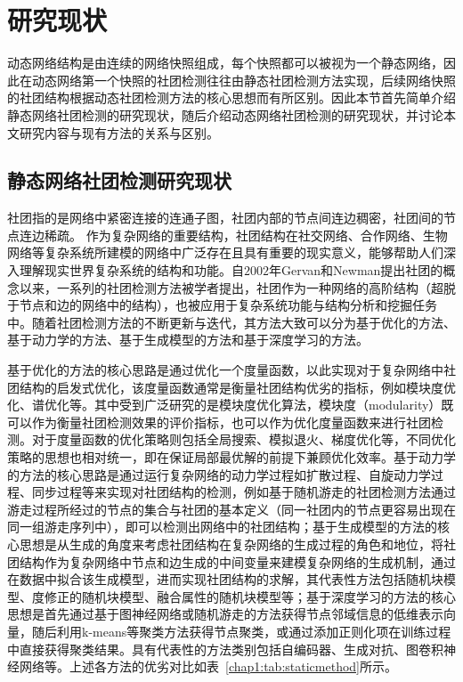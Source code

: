 \section{研究现状}


动态网络结构是由连续的网络快照组成，每个快照都可以被视为一个静态网络，因此在动态网络第一个快照的社团检测往往由静态社团检测方法实现，后续网络快照的社团结构根据动态社团检测方法的核心思想而有所区别。因此本节首先简单介绍静态网络社团检测的研究现状，随后介绍动态网络社团检测的研究现状，并讨论本文研究内容与现有方法的关系与区别。
\subsection{静态网络社团检测研究现状}

社团指的是网络中紧密连接的连通子图，社团内部的节点间连边稠密，社团间的节点连边稀疏。
作为复杂网络的重要结构，社团结构在社交网络、合作网络、生物网络等复杂系统所建模的网络中广泛存在且具有重要的现实意义，能够帮助人们深入理解现实世界复杂系统的结构和功能\cite{peng2024unsupervised}。自$2002$年Gervan和Newman提出社团的概念以来\cite{girvan2002community}，一系列的社团检测方法被学者提出，社团作为一种网络的高阶结构（超脱于节点和边的网络中的结构），也被应用于复杂系统功能与结构分析和挖掘任务中。随着社团检测方法的不断更新与迭代，其方法大致可以分为基于优化的方法、基于动力学的方法、基于生成模型的方法和基于深度学习的方法\cite{fortunato2016community,jin2021survey}。

基于优化的方法的核心思路是通过优化一个度量函数，以此实现对于复杂网络中社团结构的启发式优化，该度量函数通常是衡量社团结构优劣的指标，例如模块度优化、谱优化等。其中受到广泛研究的是模块度优化算法\cite{zhang2009modularity}，模块度（modularity）既可以作为衡量社团检测效果的评价指标，也可以作为优化度量函数来进行社团检测。对于度量函数的优化策略则包括全局搜索、模拟退火、梯度优化等\cite{zhang2014scalable,lee2012modularity}，不同优化策略的思想也相对统一，即在保证局部最优解的前提下兼顾优化效率。基于动力学的方法的核心思路是通过运行复杂网络的动力学过程如扩散过程\cite{10684291}、自旋动力学过程\cite{traag2011narrow}、同步过程\cite{boccaletti2007detecting}等来实现对社团结构的检测，例如基于随机游走的社团检测方法\cite{verma2025rw,RJXB201912017}通过游走过程所经过的节点的集合与社团的基本定义（同一社团内的节点更容易出现在同一组游走序列中），即可以检测出网络中的社团结构；基于生成模型的方法的核心思想是从生成的角度来考虑社团结构在复杂网络的生成过程的角色和地位，将社团结构作为复杂网络中节点和边生成的中间变量来建模复杂网络的生成机制，通过在数据中拟合该生成模型，进而实现社团结构的求解，其代表性方法包括随机块模型\cite{Huang02072024}、度修正的随机块模型\cite{karrer2011stochastic,JSJX202204007}、融合属性的随机块模型\cite{WANG2025130432}等；基于深度学习的方法的核心思想是首先通过基于图神经网络或随机游走的方法获得节点邻域信息的低维表示向量，随后利用k-means等聚类方法获得节点聚类，或通过添加正则化项在训练过程中直接获得聚类结果。具有代表性的方法类别包括自编码器\cite{sun2020network}、生成对抗\cite{zhang2020seal}、图卷积神经网络\cite{bernini2024evading}等。上述各方法的优劣对比如表~\ref{chap1:tab:staticmethod}所示。


